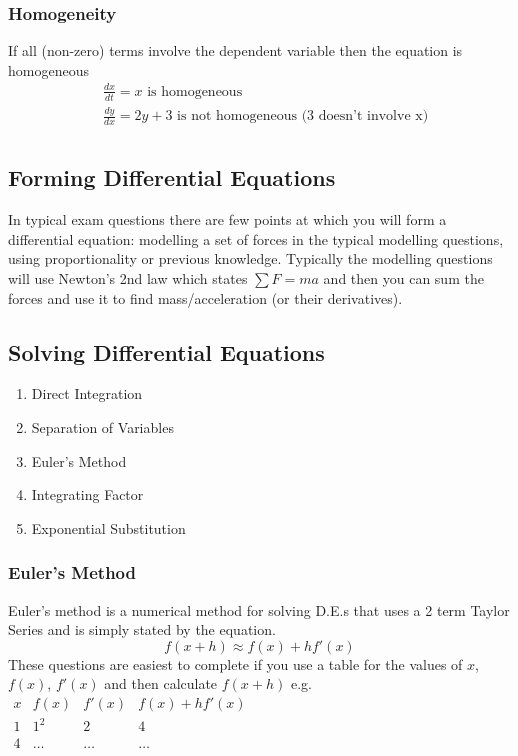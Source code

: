 \documentclass[12pt] {article}
\begin{document}
\subsubsection*{Homogeneity} 
If all (non-zero) terms involve the dependent variable then the equation is homogeneous
\begin{align*}
    &\frac{dx}{dt} = x \text{ is homogeneous} \\
    &\frac{dy}{dx} = 2y + 3 \text{ is not homogeneous (3 doesn't involve x)} \\
\end{align*}

\subsection*{Forming Differential Equations}
In typical exam questions there are few points at which you will form a differential equation: modelling a set 
of forces in the typical modelling questions, using proportionality or previous knowledge. Typically the modelling 
questions will use Newton's 2nd law which states $\sum F = ma$ and then you can sum the forces and use it to find
mass/acceleration (or their derivatives). 

\subsection*{Solving Differential Equations}
\begin{enumerate} 
    \item Direct Integration
    \item Separation of Variables 
    \item Euler's Method    
    \item Integrating Factor
    \item Exponential Substitution
\end{enumerate}

\subsubsection*{Euler's Method}
Euler's method is a numerical method for solving D.E.s that uses a 2 term Taylor Series 
and is simply stated by the equation.
\begin{equation*}
  f(x+h) \approx f(x) + hf'(x)
\end{equation*}
These questions are easiest to complete if you use a table for the values 
of $x$, $f(x)$, $f'(x)$ and then calculate $f(x+h)$ e.g.
\vspace{1em}
\newline
$\begin{array}{c|c|c|c}
  x & f(x) & f'(x) & f(x) + hf'(x) \\
  1 & 1^2 & 2 & 4 \\
  4 & \dots & \dots & \dots \\
\end{array}$
\end{document}
